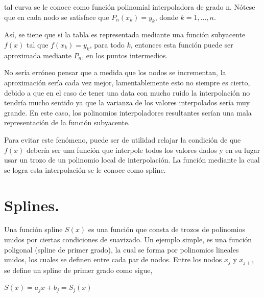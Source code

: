 \vspace{0.2cm}

\noindent tal curva se le conoce como funci\'on polinomial interpoladora de grado n. N\'otese que en cada nodo se satisface que $P_{n}(x_{k})=y_{k}$, donde $k=1,...,n$.


\hspace{0.4cm} As\'i, se tiene que si la tabla es representada mediante una funci\'on subyacente $f(x)$ tal que $f(x_{k})=y_{k}$, para todo $k$, entonces esta funci\'on puede ser aproximada mediante $P_{n}$, en los puntos intermedios.



\hspace{0.4cm} No ser\'ia err\'oneo pensar que a medida que los nodos se incrementan, la aproximaci\'on ser\'ia cada vez mejor, lamentablemente esto no siempre es cierto, debido a que en el caso de tener una data con mucho ruido la interpolaci\'on no tendr\'ia mucho sentido ya que la varianza de los valores interpolados ser\'ia muy grande. En este caso, los polinomios interpoladores resultantes ser\'ian una mala representaci\'on de la funci\'on subyacente.


\hspace{0.4cm} Para evitar este fen\'omeno, puede ser de utilidad relajar la condici\'on de que $f(x)$ deber\'ia ser una funci\'on que interpole todos los valores dados y en su lugar usar un trozo de un polinomio local de interpolaci\'on. La funci\'on mediante la cual se logra esta interpolaci\'on se le conoce como spline.


\section{Splines.}


\hspace{0.4cm} Una funci\'on spline $S(x)$ es una funci\'on que consta de trozos de polinomios unidos por ciertas condiciones de suavizado. Un ejemplo simple, es una funci\'on poligonal (spline de primer grado), la cual se forma por polinomios lineales unidos, los cuales se definen entre cada par de nodos. Entre los nodos $x_{j}$ y $x_{j+1}$ se define un spline de primer grado como sigue, \\

\begin{center}

$\displaystyle{S(x) = a_{j}x + b_{j} = S_{j}(x)}$

\end{center}

